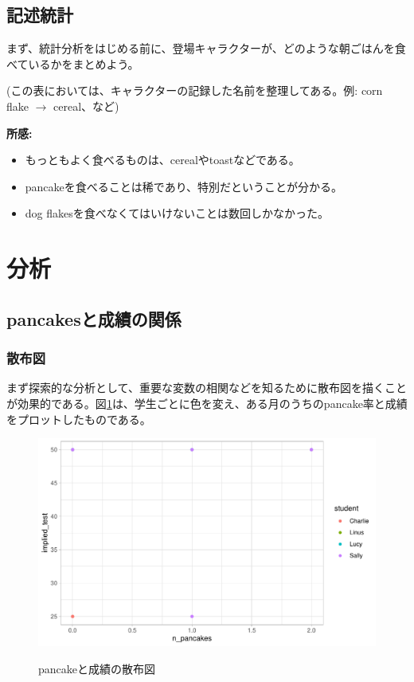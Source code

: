 \documentclass[xelatex,ja=standard]{bxjsarticle}
\begin{document}
\subsection{記述統計}

まず、統計分析をはじめる前に、登場キャラクターが、どのような朝ごはんを食べているかをまとめよう。


(この表においては、キャラクターの記録した名前を整理してある。例: corn flake $\rightarrow$ cereal、など)

\textbf{所感:}
\begin{itemize}
\item もっともよく食べるものは、cerealやtoastなどである。
\item pancakeを食べることは稀であり、特別だということが分かる。
\item dog flakesを食べなくてはいけないことは数回しかなかった。
\end{itemize}

\section{分析} 

\subsection{pancakesと成績の関係}
\subsubsection{散布図}
まず探索的な分析として、重要な変数の相関などを知るために散布図を描くことが効果的である。図\ref{fig:img1}は、学生ごとに色を変え、ある月のうちのpancake率と成績をプロットしたものである。

\begin{figure}[h]
\centering
\includegraphics[width=12cm]{04_analyze/pancakes_study/figure/pancakes_study.pdf}
\label{fig:img1}
\caption{pancakeと成績の散布図}
\end{figure}
\end{document}
